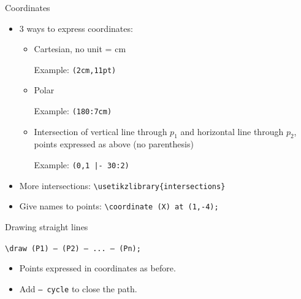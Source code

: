 \documentclass[11pt]{beamer}
\newcommand{\bs}{\textbackslash}
\begin{document}
\begin{frame}{Coordinates}
  \begin{itemize}
    \item $3$ ways to express coordinates:

      \vspace{0.2cm}
      \begin{itemize}
        \item Cartesian, no unit = cm

              Example: \texttt{(2cm,11pt)}

              \vspace{0.2cm}
        \item Polar 
        
              Example: \texttt{(180:7cm)}

              \vspace{0.2cm}
        \item Intersection of vertical line through $p_1$ and horizontal line
              through $p_2$, points expressed as above (no parenthesis)
              
              Example: \texttt{(0,1 |- 30:2)}
      \end{itemize}
    \item More intersections: \texttt{\bs usetikzlibrary\{intersections\}}
    \item Give names to points: \texttt{\bs coordinate (X) at (1,-4);}
  \end{itemize}
\end{frame}

\begin{frame}{Drawing straight lines}
  \begin{center}
    \texttt{\bs draw (P1) -- (P2) -- ... -- (Pn);}
  \end{center}

  \vspace{0.5cm}
  \begin{itemize}
    \item Points expressed in coordinates as before.
    \item Add \texttt{-- cycle} to close the path.
  \end{itemize}
\end{frame}
\end{document}
